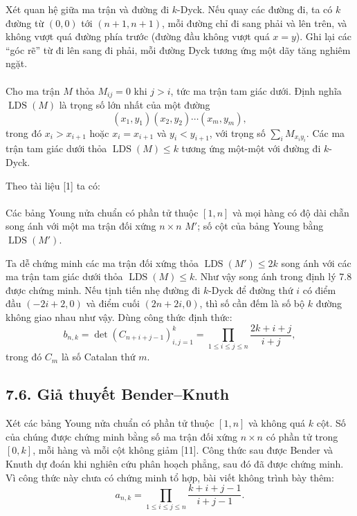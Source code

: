 \documentclass[11pt]{article}
\begin{document}
Xét quan hệ giữa ma trận và đường đi \(k\)-Dyck. Nếu quay các đường đi, ta có
\(k\) đường từ \((0,0)\) tới \((n+1,n+1)\), mỗi đường chỉ đi sang phải và lên
trên, và không vượt quá đường phía trước (đường đầu không vượt quá
\(x=y\)). Ghi lại các ``góc rẽ'' từ đi lên sang đi phải, mỗi đường Dyck tương
ứng một dãy tăng nghiêm ngặt.

\paragraph{}
Cho ma trận \(M\) thỏa \(M_{ij}=0\) khi \(j>i\), tức ma trận tam giác dưới.
Định nghĩa \(\operatorname{LDS}(M)\) là trọng số lớn nhất của một đường
\[
(x_1,y_1)(x_2,y_2)\cdots(x_m,y_m),
\]
trong đó \(x_i>x_{i+1}\) hoặc \(x_i=x_{i+1}\) và \(y_i<y_{i+1}\), với trọng
số \(\sum_i M_{x_i y_i}\). Các ma trận tam giác dưới thỏa
\(\operatorname{LDS}(M)\le k\) tương ứng một-một với đường đi \(k\)-Dyck.

Theo tài liệu [1] ta có:

\paragraph{}
Các bảng Young nửa chuẩn có phần tử thuộc \([1,n]\) và mọi hàng có độ dài
chẵn song ánh với một ma trận đối xứng \(n\times n\) \(M'\); số cột của bảng
Young bằng \(\operatorname{LDS}(M')\).

Ta dễ chứng minh các ma trận đối xứng thỏa \(\operatorname{LDS}(M')\le2k\)
song ánh với các ma trận tam giác dưới thỏa \(\operatorname{LDS}(M)\le k\).
Như vậy song ánh trong định lý 7.8 được chứng minh. Nếu tịnh tiến nhẹ đường
đi \(k\)-Dyck để đường thứ \(i\) có điểm đầu \((-2i+2,0)\) và điểm cuối
\((2n+2i,0)\), thì số cần đếm là số bộ \(k\) đường không giao nhau như vậy.
Dùng công thức định thức:
\[
b_{n,k}=\det(C_{n+i+j-1})_{i,j=1}^k
=\prod_{1\le i\le j\le n}\frac{2k+i+j}{i+j},
\]
trong đó \(C_m\) là số Catalan thứ \(m\).

\subsection*{7.6. Giả thuyết Bender--Knuth}

Xét các bảng Young nửa chuẩn có phần tử thuộc \([1,n]\) và không quá \(k\)
cột. Số của chúng được chứng minh bằng số ma trận đối xứng \(n\times n\) có
phần tử trong \([0,k]\), mỗi hàng và mỗi cột không giảm [11]. Công thức sau
được Bender và Knuth dự đoán khi nghiên cứu phân hoạch phẳng, sau đó đã được
chứng minh. Vì công thức này chưa có chứng minh tổ hợp, bài viết không trình
bày thêm:
\[
a_{n,k}=\prod_{1\le i\le j\le n}\frac{k+i+j-1}{i+j-1}.
\]
\end{document}

